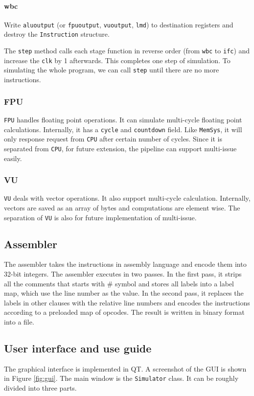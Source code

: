 \documentclass{sig-alternate}
\begin{document}
\paragraph{wbc}
Write \texttt{aluoutput} (or \texttt{fpuoutput}, \texttt{vuoutput}, \texttt{lmd}) to destination registers and destroy the \texttt{Instruction} structure.

The \texttt{step} method calls each stage function in reverse order (from \texttt{wbc} to \texttt{ifc}) and increase the \texttt{clk} by 1 afterwards. This completes one step of simulation. To simulating the whole program, we can call \texttt{step} until there are no more instructions. 

\subsubsection{FPU}
\texttt{FPU} handles floating point operations. It can simulate multi-cycle floating point calculations. Internally, it has a \texttt{cycle} and \texttt{countdown} field. Like \texttt{MemSys}, it will only response request from \texttt{CPU} after certain number of cycles. Since it is separated from \texttt{CPU}, for future extension, the pipeline can support multi-issue easily. 

\subsubsection{VU}
\texttt{VU} deals with vector operations. It also support multi-cycle calculation. Internally, vectors are saved as an array of bytes and computations are element wise. The separation of \texttt{VU} is also for future implementation of multi-issue.

\subsection{Assembler }
The assembler takes the instructions in assembly language and encode them into 32-bit integers. The assembler executes in two passes. In the first pass, it strips all the comments that starts with $\#$ symbol and stores all labels into a label map, which use the line number as the value. In the second pass, it replaces the labels in other clauses with the relative line numbers and encodes the instructions according to a preloaded map of opcodes. The result is written in binary format into a file. 

\subsection{User interface and use guide}
The graphical interface is implemented in QT. A screenshot of the GUI is shown in Figure \ref{fig:gui}. The main window is the \texttt{Simulator} class. It can be roughly divided into three parts. 
\end{document}
